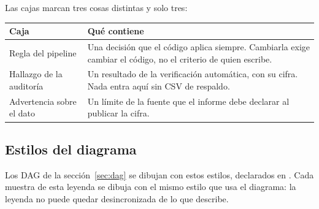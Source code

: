 \documentclass[11pt,a4paper]{article}
\begin{document}
\vspace{6pt}
Las cajas marcan tres cosas distintas y solo tres:

\vspace{4pt}
\noindent\begin{tabularx}{\linewidth}{l >{\RaggedRight\arraybackslash}X}
\toprule
\textbf{Caja} & \textbf{Qué contiene} \\
\midrule
Regla del pipeline & Una decisión que el código aplica siempre. Cambiarla exige cambiar el código, no el criterio de quien escribe. \\
Hallazgo de la auditoría & Un resultado de la verificación automática, con su cifra. Nada entra aquí sin CSV de respaldo. \\
Advertencia sobre el dato & Un límite de la fuente que el informe debe declarar al publicar la cifra. \\
\bottomrule
\end{tabularx}

\subsection{Estilos del diagrama}
\label{sec:estilos-dag}

Los DAG de la sección~\ref{sec:dag} se dibujan con estos estilos, declarados en
. Cada muestra de esta leyenda se dibuja con el
mismo estilo que usa el diagrama: la leyenda no puede quedar desincronizada de
lo que describe.
\end{document}
